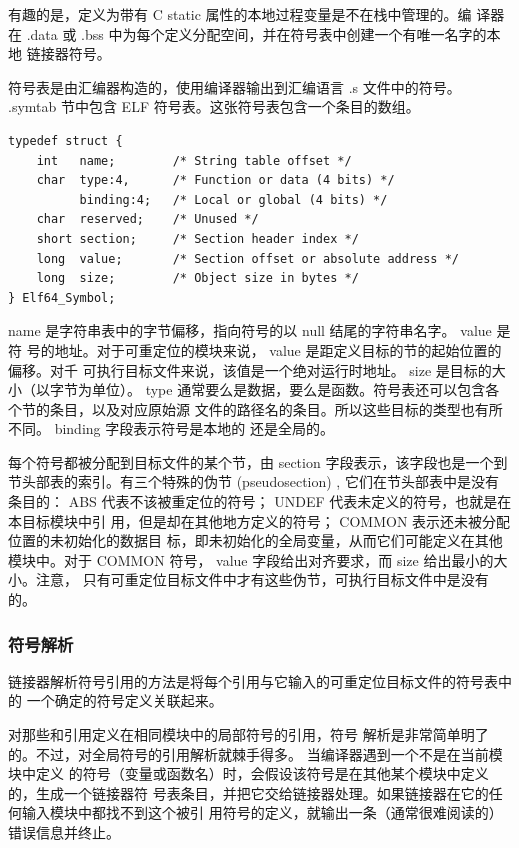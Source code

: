 有趣的是，定义为带有 C static 属性的本地过程变量是不在栈中管理的。编
译器在 .data 或 .bss 中为每个定义分配空间，并在符号表中创建一个有唯一名字的本地
链接器符号。

符号表是由汇编器构造的，使用编译器输出到汇编语言 .s 文件中的符号。
.symtab 节中包含 ELF 符号表。这张符号表包含一个条目的数组。

\begin{lstlisting}[style=CStyle]
typedef struct {
    int   name;        /* String table offset */
    char  type:4,      /* Function or data (4 bits) */
          binding:4;   /* Local or global (4 bits) */
    char  reserved;    /* Unused */
    short section;     /* Section header index */
    long  value;       /* Section offset or absolute address */
    long  size;        /* Object size in bytes */
} Elf64_Symbol;
\end{lstlisting}

name 是字符串表中的字节偏移，指向符号的以 null 结尾的字符串名字。 value 是符
号的地址。对于可重定位的模块来说， value 是距定义目标的节的起始位置的偏移。对千
可执行目标文件来说，该值是一个绝对运行时地址。 size 是目标的大小（以字节为单位）。
type 通常要么是数据，要么是函数。符号表还可以包含各个节的条目，以及对应原始源
文件的路径名的条目。所以这些目标的类型也有所不同。 binding 字段表示符号是本地的
还是全局的。

每个符号都被分配到目标文件的某个节，由 section 字段表示，该字段也是一个到
节头部表的索引。有三个特殊的伪节 (pseudosection) , 它们在节头部表中是没有条目的：
ABS 代表不该被重定位的符号； UNDEF 代表未定义的符号，也就是在本目标模块中引
用，但是却在其他地方定义的符号； COMMON 表示还未被分配位置的未初始化的数据目
标，即未初始化的全局变量，从而它们可能定义在其他模块中。对于 COMMON 符号， value 字段给出对齐要求，而 size 给出最小的大小。注意，
只有可重定位目标文件中才有这些伪节，可执行目标文件中是没有的。

\subsubsection{符号解析}

链接器解析符号引用的方法是将每个引用与它输入的可重定位目标文件的符号表中的
一个确定的符号定义关联起来。

对那些和引用定义在相同模块中的局部符号的引用，符号
解析是非常简单明了的。不过，对全局符号的引用解析就棘手得多。
当编译器遇到一个不是在当前模块中定义
的符号（变量或函数名）时，会假设该符号是在其他某个模块中定义的，生成一个链接器符
号表条目，并把它交给链接器处理。如果链接器在它的任何输入模块中都找不到这个被引
用符号的定义，就输出一条（通常很难阅读的）错误信息并终止。

